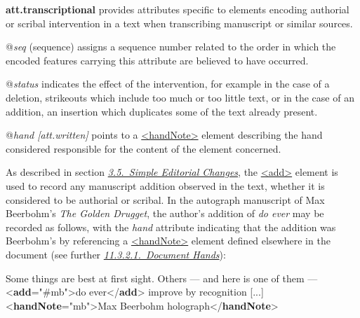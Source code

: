 \begin{sansreflist}
  
\item [\textbf{att.transcriptional}] provides attributes specific to elements encoding authorial or scribal intervention in a text when transcribing manuscript or similar sources.\hfil\\[-10pt]\begin{sansreflist}
    \item[@{\itshape seq}]
  (sequence) assigns a sequence number related to the order in which the encoded features carrying this attribute are believed to have occurred.
    \item[@{\itshape status}]
  indicates the effect of the intervention, for example in the case of a deletion, strikeouts which include too much or too little text, or in the case of an addition, an insertion which duplicates some of the text already present.
    \item[@{\itshape hand [att.written]}]
  points to a \hyperref[TEI.handNote]{<handNote>} element describing the hand considered responsible for the content of the element concerned.
\end{sansreflist}  
\end{sansreflist}
\par
As described in section \textit{\hyperref[COED]{3.5.\ Simple Editorial Changes}}, the \hyperref[TEI.add]{<add>} element is used to record any manuscript addition observed in the text, whether it is considered to be authorial or scribal. In the autograph manuscript of Max Beerbohm's \textit{The Golden Drugget}, the author's addition of \textit{do ever} may be recorded as follows, with the {\itshape hand} attribute indicating that the addition was Beerbohm's by referencing a \hyperref[TEI.handNote]{<handNote>} element defined elsewhere in the document (see further \textit{\hyperref[PHDH]{11.3.2.1.\ Document Hands}}): \par\bgroup{}\exampleFont \begin{shaded}\noindent\mbox{}Some things are best\mbox{}\newline 
 at first sight. Others — and here is one of them — {<\textbf{add}\hspace*{1em}{hand}="{\#mb}">}do ever{</\textbf{add}>}\mbox{}\newline 
 improve by recognition [...] \mbox{}\newline 
{<\textbf{handNote}\hspace*{1em}{xml:id}="{mb}">}Max Beerbohm\mbox{}\newline 
 holograph{</\textbf{handNote}>}\end{shaded}\egroup\par \par
